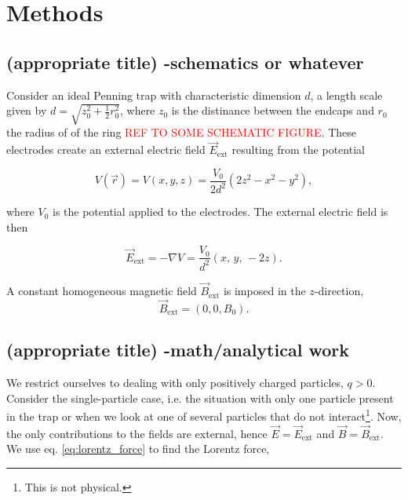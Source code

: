 \section{Methods}\label{sec:methods}


\subsection{(appropriate title) -schematics or whatever}




Consider an ideal Penning trap with characteristic dimension $d$, a length scale given by $d= \sqrt{z_0^2+ \frac{1}{2}r_0^2}$, where $z_0$ is the distinance between the endcaps and $r_0$ the radius of of the ring \textcolor{red}{REF TO SOME SCHEMATIC FIGURE}. These electrodes create an external electric field $\vec{E}_\mathrm{ext}$ resulting from the potential

\begin{equation}
    V (\vec{r})= V(x,y,z) = \frac{V_0}{2d^2}(2z^2 - x^2 - y^2), \label{eq:penning_potential}
\end{equation}

where $V_0$ is the potential applied to the electrodes. The external electric field is then 

\begin{equation}
    \vec{E}_\mathrm{ext} = -\nabla V = \frac{V_0}{d^2} (x,\,y,\,-2z). \label{eq:p1_E_field_pot_gradient}
\end{equation}

A constant homogeneous magnetic field $\vec{B}_\mathrm{ext}$ is imposed in the $z$-direction,
\begin{equation}
    \vec{B}_\mathrm{ext} = (0,0,B_0). \label{eq:homogeneous_B_field}
\end{equation}


\subsection{(appropriate title) -math/analytical work}

We restrict ourselves to dealing with only positively charged particles, $q>0$. Consider the single-particle case, i.e. the situation with only one particle present in the trap or when we look at one of several particles that do not interact\footnote{This is not physical.}. Now, the only contributions to the fields are external, hence $\vec{E} = \vec{E}_\mathrm{ext}$ and $\vec{B} = \vec{B}_\mathrm{ext}$. We use eq. \eqref{eq:lorentz_force} to find the Lorentz force,

